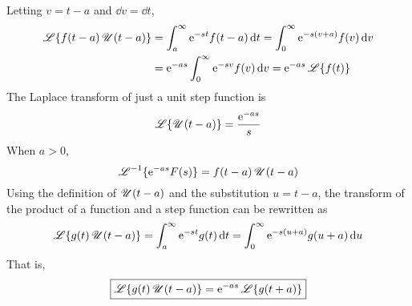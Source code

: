 \documentclass[./Differential Equations.tex]{subfiles}
\begin{document}
					Letting \(v = t - a\) and \(\dd{v} = \dd{t}\),
					\begin{align*}
						 \operatorname{\mathscr{L}}\{f(t - a)\operatorname{\mathscr{U}}(t - a)\} &= \int_a^\infty \text{e}^{-st}f(t - a) \dd{t}
						 		= \int_0^\infty \text{e}^{-s(v + a)}f(v)\dd{v} \\
						 	&= \text{e}^{-as}\int_0^\infty \text{e}^{-sv}f(v)\dd{v}
						 		= \text{e}^{-as}\operatorname{\mathscr{L}}\{f(t)\}
					\end{align*}
				The Laplace transform of just a unit step function is
					\[\operatorname{\mathscr{L}}\{\operatorname{\mathscr{U}}(t - a)\} = \frac{\text{e}^{-as}}{s}\]
				When \(a > 0\),
					\[\operatorname{\mathscr{L}}^{-1}\{\text{e}^{-as}F(s)\} = f(t - a)\operatorname{\mathscr{U}}(t - a)\]
				Using the definition of \(\operatorname{\mathscr{U}}(t - a)\) and the substitution \(u = t - a\), the transform of the product of a function and a step function can be rewritten as
					\[
						\operatorname{\mathscr{L}}\{g(t)\operatorname{\mathscr{U}}(t - a)\} = \int_a^\infty \text{e}^{-st}g(t)\dd{t}
							= \int_0^\infty \text{e}^{-s(u + a)}g(u + a) \dd{u}
					\]
					That is,
					\[\boxed{\operatorname{\mathscr{L}}\{g(t)\operatorname{\mathscr{U}}(t - a)\} = \text{e}^{-as}\operatorname{\mathscr{L}}\{g(t + a)\}}\]
\end{document}

